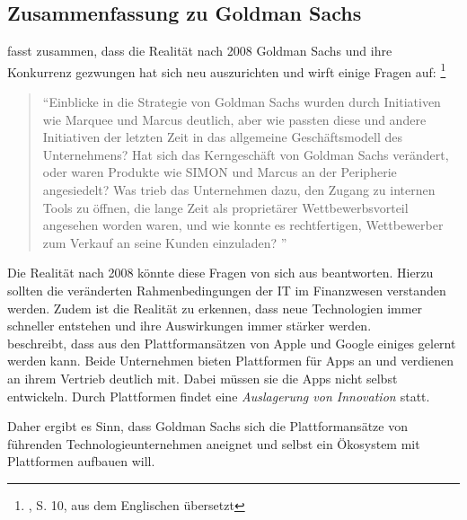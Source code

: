 \subsection{Zusammenfassung zu Goldman Sachs}
\citet{Gupta:2017} fasst zusammen, dass die Realität nach 2008 Goldman Sachs und ihre Konkurrenz gezwungen hat sich neu auszurichten und wirft einige Fragen auf: \footnote{\citet{Gupta:2017}, S. 10, aus dem Englischen übersetzt}
\begin{quote}
\enquote{Einblicke in die Strategie von Goldman Sachs wurden durch Initiativen wie Marquee und Marcus deutlich, aber wie passten diese und andere Initiativen der letzten Zeit in das allgemeine Geschäftsmodell des Unternehmens? Hat sich das Kerngeschäft von Goldman Sachs verändert, oder waren Produkte wie SIMON und Marcus an der Peripherie angesiedelt? Was trieb das Unternehmen dazu, den Zugang zu internen Tools zu öffnen, die lange Zeit als proprietärer Wettbewerbsvorteil angesehen worden waren, und wie konnte es rechtfertigen, Wettbewerber zum Verkauf an seine Kunden einzuladen?
    }
\end{quote}
Die Realität nach 2008 könnte diese Fragen von sich aus beantworten. Hierzu sollten die veränderten Rahmenbedingungen der IT im Finanzwesen verstanden werden. Zudem ist die Realität zu erkennen, dass neue Technologien immer schneller entstehen und ihre Auswirkungen immer stärker werden. 
\medskip
\\
\citet{Eismann2015} beschreibt, dass aus den Plattformansätzen von Apple und Google einiges gelernt werden kann. Beide Unternehmen bieten Plattformen für Apps an und verdienen an ihrem Vertrieb deutlich mit. Dabei müssen sie die Apps nicht selbst entwickeln. Durch Plattformen findet eine \emph{Auslagerung von Innovation \cite{Eismann2015}} statt.

Daher ergibt es Sinn, dass Goldman Sachs sich die Plattformansätze von führenden Technologieunternehmen aneignet und selbst ein Ökosystem mit Plattformen aufbauen will. 

